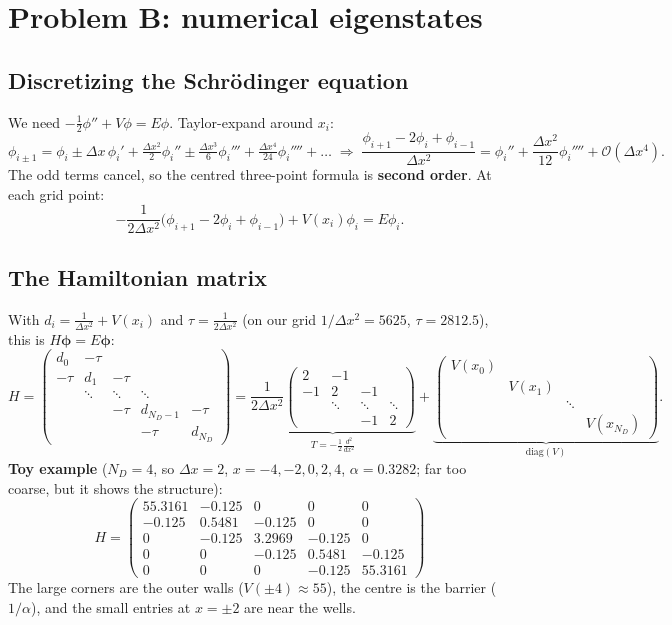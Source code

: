 \documentclass[10pt]{article}
\begin{document}
\section{Problem B: numerical eigenstates}
\subsection{Discretizing the Schr\"odinger equation}
We need $-\tfrac12\phi''+V\phi=E\phi$. Taylor-expand around $x_i$:
\[
\phi_{i\pm1}=\phi_i\pm\Delta x\,\phi_i'+\tfrac{\Delta x^2}{2}\phi_i''\pm\tfrac{\Delta x^3}{6}\phi_i'''+\tfrac{\Delta x^4}{24}\phi_i''''+\dots
\;\Rightarrow\;
\frac{\phi_{i+1}-2\phi_i+\phi_{i-1}}{\Delta x^2}=\phi_i''+\frac{\Delta x^2}{12}\phi_i''''+\mathcal O(\Delta x^4).
\]
The odd terms cancel, so the centred three-point formula is \textbf{second order}. At each grid point:
\[
-\frac{1}{2\Delta x^2}\big(\phi_{i+1}-2\phi_i+\phi_{i-1}\big)+V(x_i)\phi_i=E\phi_i .
\]

\subsection{The Hamiltonian matrix}
With $d_i=\frac1{\Delta x^2}+V(x_i)$ and $\tau=\frac1{2\Delta x^2}$ (on our grid $1/\Delta x^2=5625$, $\tau=2812.5$), this is $H\boldsymbol\phi=E\boldsymbol\phi$:
\[
H=\begin{pmatrix}
d_0 & -\tau & & & \\
-\tau & d_1 & -\tau & & \\
 & \ddots & \ddots & \ddots & \\
 & & -\tau & d_{N_D-1} & -\tau\\
 & & & -\tau & d_{N_D}
\end{pmatrix}
=\underbrace{\frac{1}{2\Delta x^2}\begin{pmatrix}2&-1&&\\-1&2&-1&\\&\ddots&\ddots&\ddots\\&&-1&2\end{pmatrix}}_{T=-\frac12\frac{d^2}{dx^2}}
+\underbrace{\begin{pmatrix}V(x_0)&&&\\&V(x_1)&&\\&&\ddots&\\&&&V(x_{N_D})\end{pmatrix}}_{\mathrm{diag}(V)}.
\]
\textbf{Toy example} ($N_D=4$, so $\Delta x=2$, $x=-4,-2,0,2,4$, $\alpha=0.3282$; far too coarse, but it shows the structure):
\[
H=\begin{pmatrix}
55.3161 & -0.125 & 0 & 0 & 0\\
-0.125 & 0.5481 & -0.125 & 0 & 0\\
0 & -0.125 & 3.2969 & -0.125 & 0\\
0 & 0 & -0.125 & 0.5481 & -0.125\\
0 & 0 & 0 & -0.125 & 55.3161
\end{pmatrix}
\]
The large corners are the outer walls ($V(\pm4)\approx55$), the centre is the barrier ($1/\alpha$), and the small entries at $x=\pm2$ are near the wells.
\end{document}
